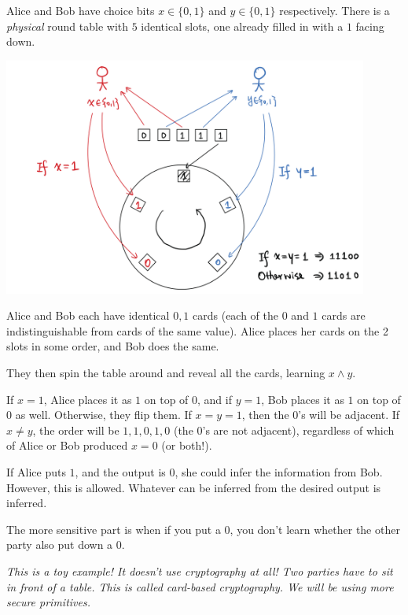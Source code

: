 \begin{example*}
    Alice and Bob have choice bits $x\in\{0, 1\}$ and $y\in\{0, 1\}$ respectively. There is a \emph{physical} round table with $5$ identical slots, one already filled in with a $1$ facing down.

    \begin{center}
        \includegraphics[width=0.9\textwidth]{images/2023-01-26/private_dating.png}
    \end{center}

    Alice and Bob each have identical $0, 1$ cards (each of the $0$ and $1$ cards are indistinguishable from cards of the same value). Alice places her cards on the 2 slots in some order, and Bob does the same.

    They then spin the table around and reveal all the cards, learning $x\land y$.

    If $x = 1$, Alice places it as $1$ on top of $0$, and if $y = 1$, Bob places it as $1$ on top of $0$ as well. Otherwise, they flip them. If $x = y = 1$, then the $0$'s will be adjacent. If $x \neq y$, the order will be $1,1,0,1,0$ (the $0$'s are not adjacent), regardless of which of Alice or Bob produced $x = 0$ (or both!).
\end{example*}
\begin{ques*}
    If Alice puts $1$, and the output is $0$, she could infer the information from Bob. However, this is allowed. Whatever can be inferred from the desired output is inferred.

    The more sensitive part is when if you put a $0$, you don't learn whether the other party also put down a $0$.
\end{ques*}
\emph{This is a toy example! It doesn't use cryptography at all! Two parties have to sit in front of a table. This is called card-based cryptography. We will be using more secure primitives.}

